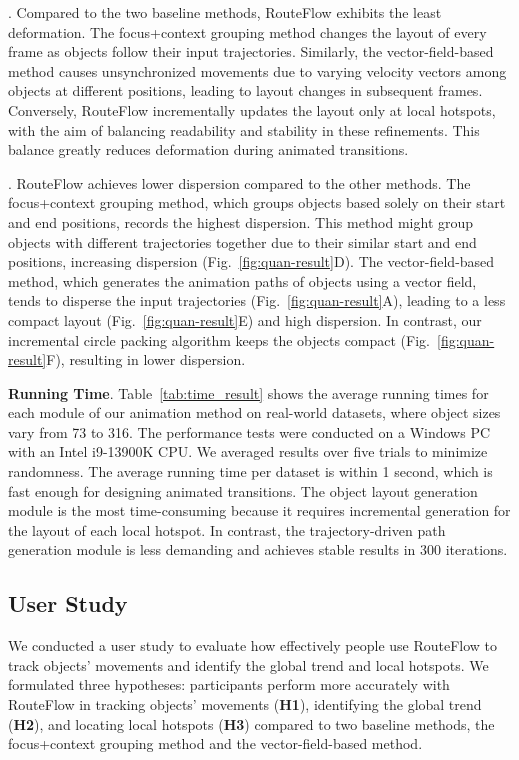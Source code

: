 .
Compared to the two baseline methods, RouteFlow exhibits the least deformation.
The focus+context grouping method changes the layout of every frame as objects follow their input trajectories.
Similarly, the vector-field-based method causes unsynchronized movements due to varying velocity vectors among objects at different positions, leading to layout changes in subsequent frames. 
Conversely, RouteFlow incrementally updates the layout only at local hotspots, with the aim of balancing readability and stability in these refinements.
This balance greatly reduces deformation during animated transitions.



.
RouteFlow achieves lower dispersion compared to the other methods.
The focus+context grouping method, which groups objects based solely on their start and end positions, records the highest dispersion. 
This method might group objects with different trajectories together due to their similar start and end positions, increasing dispersion (Fig.~\ref{fig:quan-result}D).
The vector-field-based method, which generates the animation paths of objects using a vector field, tends to disperse the input trajectories (Fig.~\ref{fig:quan-result}A), leading to a less compact layout (Fig.~\ref{fig:quan-result}E) and high dispersion.
In contrast, our incremental circle packing algorithm keeps the objects compact (Fig.~\ref{fig:quan-result}F), resulting in lower dispersion.

\noindent\textbf{Running Time}. 
\label{para:runningtime}
Table~\ref{tab:time_result} shows the average running times for each module of our animation method on real-world datasets, where object sizes vary from 73 to 316.
The performance tests were conducted on a Windows PC with an Intel i9-13900K CPU.
We averaged results over five trials to minimize randomness.
The average running time per dataset is within 1 second, which is fast enough for designing animated transitions.
The object layout generation module is the most time-consuming because it requires incremental generation for the layout of each local hotspot.
In contrast, the trajectory-driven path generation module is less demanding and achieves stable results in 300 iterations.




\subsection{User Study}
\label{sec:userstudy}
We conducted a user study to evaluate how effectively people use RouteFlow to track objects' movements and identify the global trend and local hotspots.
We formulated three hypotheses: participants perform more accurately with RouteFlow in tracking objects' movements (\textbf{H1}), identifying the global trend (\textbf{H2}), and locating local hotspots (\textbf{H3}) compared to two baseline methods, the focus+context grouping method and the vector-field-based method.

